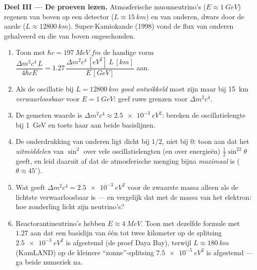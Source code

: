 \begin{problem}
\medskip\noindent\textbf{Deel III --- De proeven lezen.}
Atmosferische muonneutrino's ($E \approx \qty{1}{GeV}$) regenen van boven
op een detector ($L \approx \qty{15}{km}$) en van onderen, dwars door de
aarde ($L \approx \qty{12800}{km}$). Super-Kamiokande (1998) vond de flux
van onderen gehalveerd en die van boven ongeschonden.
\begin{enumerate}[resume]
  \item Toon met $\hbar c = \qty{197}{MeV.fm}$ de handige vorm
        $\dfrac{\Delta m^2c^4\,L}{4\hbar cE} = 1.27\,
        \dfrac{\Delta m^2c^4\,[\unit{eV^2}]\ L\,[\unit{km}]}
        {E\,[\unit{GeV}]}$ aan.
  \item Als de oscillatie bij $L =
        \qty{12800}{km}$ \emph{goed
        ontwikkeld} moet zijn maar bij \qty{15}{km} \emph{verwaarloosbaar}
        voor $E = \qty{1}{GeV}$: geef ruwe grenzen voor $\Delta m^2c^4$.
  \item De gemeten waarde is $\Delta m^2c^4 \approx
        \qty{2.5e-3}{eV^2}$: bereken de oscillatielengte bij
        \qty{1}{GeV} en toets haar aan beide basislijnen.
  \item De onderdrukking van onderen ligt dicht bij $1/2$, niet bij $0$:
        toon aan dat het \emph{uitmiddelen} van $\sin^2$ over vele
        oscillatielengten (en over energieën) $\tfrac12\sin^22\theta$
        geeft, en leid daaruit af dat de atmosferische menging bijna
        \emph{maximaal} is ($\theta \approx 45^\circ$).
  \item Wat geeft $\Delta m^2c^4 = \qty{2.5e-3}{eV^2}$ voor de zwaarste
        massa alleen als de lichtste verwaarloosbaar is --- en vergelijk
        dat met de massa van het elektron: hoe zonderling licht zijn
        neutrino's?
  \item Reactorantineutrino's hebben $E \approx \qty{4}{MeV}$. Toon met
        dezelfde formule met $1.27$ aan dat een basislijn van één tot
        twee kilometer op de splitsing $\qty{2.5e-3}{eV^2}$ is afgestemd
        (de proef Daya Bay), terwijl $L \approx \qty{180}{km}$ (KamLAND)
        op de kleinere ``zonne''-splitsing $\qty{7.5e-5}{eV^2}$ is
        afgestemd --- ga beide numeriek na.
\end{enumerate}


\end{problem}
